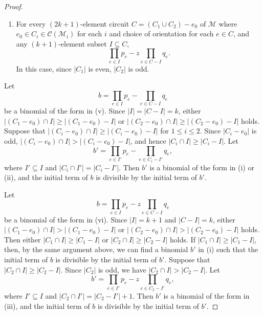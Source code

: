 \documentclass{amsart}
\numberwithin{equation}{section}
\theoremstyle{plain}
\theoremstyle{definition}
\newcommand{\calC}{\mathcal{C}}
\newcommand{\calM}{\mathcal{M}}
\begin{document}
\begin{proof}
\begin{enumerate}[label={\rm (\roman*)}]
        \item
        For every $(2k+1)$-element circuit $C=(C_1 \cup C_2)-e_0$ of $\calM$ where 
        $e_0 \in C_i \in \calC(\calM_i)$ for each $i$
        and choice of orientation for each $e \in C$, and any $(k+1)$-element subset $I \subseteq C$,
        \[
            \prod_{e \in I} p_e - z\prod_{e \in C - I} q_e.
        \]
        In this case, since $|C_1|$ is even, $|C_2|$ is odd.
    \end{enumerate}
    
Let 
\[
b=\prod_{e \in I} p_e - \prod_{e \in C - I} q_e
\]
be a binomial of the form in (v).
Since $|I| = |C-I| =k$, either 
 $|(C_1-e_0) \cap I| \ge |(C_1-e_0) - I|$
 or
 $|(C_2-e_0) \cap I| \ge |(C_2-e_0) - I|$ holds.
Suppose that $|(C_i-e_0) \cap I| \ge |(C_i-e_0) - I|$
for $1 \le i \le 2$.
Since $|C_i-e_0|$ is odd, 
 $|(C_i-e_0) \cap I| > |(C_i-e_0) - I|$,
 and hence $|C_i \cap I| \ge | C_i - I|$.
Let 
 \[b'= \prod_{e \in I'} p_e - \prod_{e \in C_i - I'} q_e,\]
 where $I' \subseteq I$ and $|C_i \cap I'| = | C_i - I'|$.
 Then $b'$
 is a binomial of the form in (i) or (ii), and the initial term of $b$ is divisible by the initial term of $b'$.

Let 
\[
b=\prod_{e \in I} p_e - z \prod_{e \in C - I} q_e
\]
be a binomial of the form in (vi).
Since $|I| = k+1$ and $|C-I| =k$, either 
 $|(C_1-e_0) \cap I| > |(C_1-e_0) - I|$
 or
 $|(C_2-e_0) \cap I| > |(C_2-e_0) - I|$ holds.
Then 
either 
 $|C_1 \cap I| \ge |C_1 - I|$
 or $|C_2 \cap I| \ge |C_2 - I|$
 holds.
If $|C_1 \cap I| \ge |C_1 - I|$,
then,
by the same argument above,
we can find a binomial $b'$ in (i) such that
the initial term of $b$ is divisible by the initial term of $b'$.
Suppose that $|C_2 \cap I| \ge |C_2 - I|$.
Since $|C_2|$ is odd, we have $|C_2 \cap I| > |C_2 - I|$.
Let 
 \[b'= \prod_{e \in I'} p_e - z \prod_{e \in C_2 - I'} q_e,\]
 where $I' \subseteq I$ and $|C_2 \cap I'| = | C_2 - I'|+1$.
 Then $b'$
 is a binomial of the form in (iii),
 and the initial term of $b$ is divisible by the initial term of $b'$.


\end{proof}
\end{document}

